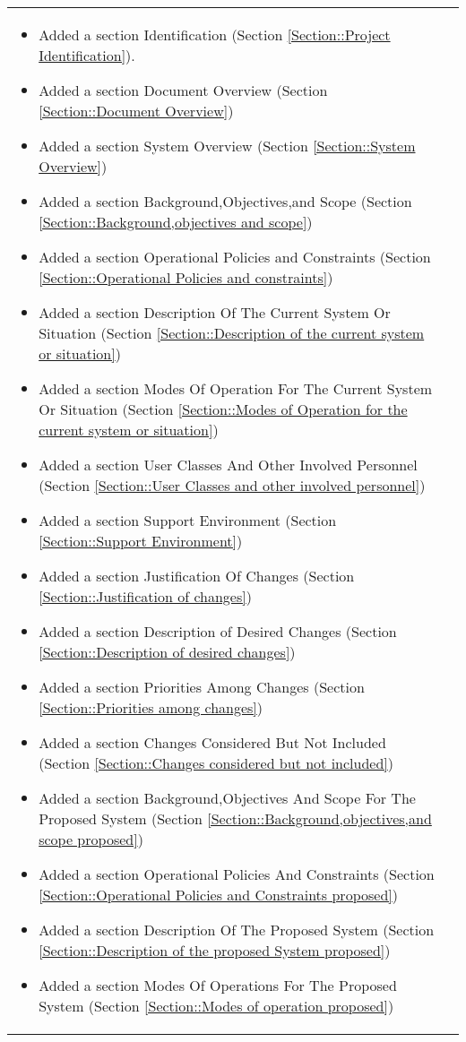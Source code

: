 \begin{longtable}{|l||p{13.5cm}|}
\begin{itemize}[topsep=0pt,itemsep=0pt,parsep=0pt,partopsep=0pt,leftmargin=12pt]
\item Added a section Identification (Section \ref{Section::Project Identification}).
\item Added a section Document Overview (Section \ref{Section::Document Overview})
\item Added a section System Overview (Section \ref{Section::System Overview})
\item Added a section Background,Objectives,and Scope (Section \ref{Section::Background,objectives and scope})
\item Added a section Operational Policies and Constraints (Section \ref{Section::Operational Policies and constraints})
\item Added a section Description Of The Current System Or Situation (Section \ref{Section::Description of the current system or situation})
\item Added a section Modes Of Operation For The Current System Or Situation (Section \ref{Section::Modes of Operation for the current system or situation})
\item Added a section User Classes And Other Involved Personnel (Section \ref{Section::User Classes and other involved personnel})
\item Added a section Support Environment (Section \ref{Section::Support Environment})
\item Added a section Justification Of Changes (Section \ref{Section::Justification of changes})
\item Added a section Description of Desired Changes (Section \ref{Section::Description of desired changes})
\item Added a section Priorities Among Changes (Section \ref{Section::Priorities among changes})
\item Added a section Changes Considered But Not Included (Section \ref{Section::Changes considered but not included})
\item Added a section Background,Objectives And Scope For The Proposed System (Section \ref{Section::Background,objectives,and scope proposed})
\item Added a section Operational Policies And Constraints (Section \ref{Section::Operational Policies and Constraints proposed})
\item Added a section Description Of The Proposed System (Section \ref{Section::Description of the proposed System proposed})
\item Added a section Modes Of Operations For The Proposed System  (Section \ref{Section::Modes of operation proposed})

\end{itemize}
\end{longtable}
